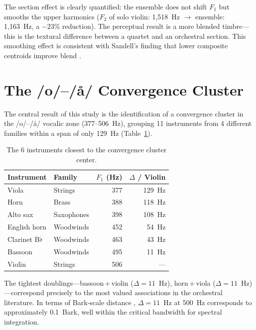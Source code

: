 \documentclass[12pt,a4paper]{article}
\begin{document}
The section effect is clearly quantified: the ensemble does not shift $F_1$
but smooths the upper harmonics ($F_2$ of solo violin: 1,518~Hz $\rightarrow$
ensemble: 1,163~Hz, a $-23$\% reduction). The perceptual result is a more
blended timbre---this is the textural difference between a quartet and an
orchestral section. This smoothing effect is consistent with Sandell's finding
that lower composite centroids improve blend \citep{Sandell1995}.

\section{The /o/--/\aa/ Convergence Cluster}

The central result of this study is the identification of a convergence cluster
in the /o/--/\aa/ vocalic zone (377--506~Hz), grouping 11 instruments from
4 different families within a span of only 129~Hz (Table~\ref{tab:cluster}).

\begin{table}[htbp]
\centering
\caption{The 6 instruments closest to the convergence cluster center.}
\label{tab:cluster}
\begin{tabular}{llrr}
\toprule
Instrument & Family & $F_1$ (Hz) & $\Delta$ / Violin \\
\midrule
Viola        & Strings     & 377 & 129~Hz \\
Horn         & Brass       & 388 & 118~Hz \\
Alto sax     & Saxophones  & 398 & 108~Hz \\
English horn & Woodwinds   & 452 & 54~Hz \\
Clarinet B$\flat$ & Woodwinds & 463 & 43~Hz \\
Bassoon      & Woodwinds   & 495 & 11~Hz \\
Violin       & Strings     & 506 & --- \\
\bottomrule
\end{tabular}
\end{table}

The tightest doublings---bassoon\,+\,violin ($\Delta = 11$~Hz),
horn\,+\,viola ($\Delta = 11$~Hz)---correspond precisely to the most valued
associations in the orchestral literature. In terms of Bark-scale distance
\citep{Zwicker1961}, $\Delta = 11$~Hz at 500~Hz corresponds to approximately
0.1~Bark, well within the critical bandwidth for spectral integration.
\end{document}
